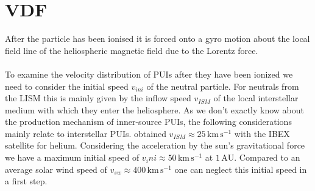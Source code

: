 \section{VDF}
After the particle has been ionised it is forced onto a gyro motion about the local field line of the heliospheric magnetic field due to the Lorentz force. 
\\ \\
To examine the velocity distribution of PUIs after they have been ionized we need to consider the initial speed $v_{ini}$ of the neutral particle. 
For neutrals from the LISM this is mainly given by the inflow speed $v_{ISM}$ of the local interstellar medium with which they enter the heliosphere. As we don't exactly know about the production mechanism of inner-source PUIs, the following considerations mainly relate to interstellar PUIs.
\citet{schwadron_2015_ibex} obtained $v_{ISM} \approx 25 \,\mathrm{km\,s^{-1}}$ with the IBEX satellite for helium. Considering the acceleration by the sun's gravitational force we have a maximum initial speed of $v_ini \approx 50 \,\mathrm{km\,s^{-1}}$ at $1\,\mathrm{AU}$. Compared to an average solar wind speed of $v_{sw} \approx 400\,\mathrm{km\,s^{-1}}$ one can neglect this initial speed in a first step.

